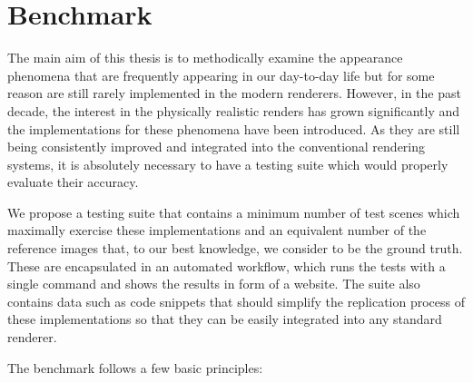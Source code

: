 \chapter{Benchmark}
\label{chap:benchmark}

The main aim of this thesis is to methodically examine the appearance phenomena that are frequently appearing in our day-to-day life but for some reason are still rarely implemented in the modern renderers. However, in the past decade, the interest in the physically realistic renders has grown significantly and the implementations for these phenomena have been introduced. As they are still being consistently improved and integrated into the conventional rendering systems, it is absolutely necessary to have a testing suite which would properly evaluate their accuracy.

We propose a testing suite that contains a minimum number of test scenes which maximally exercise these implementations and an equivalent number of the reference images that, to our best knowledge, we consider to be the ground truth. These are encapsulated in an automated workflow, which runs the tests with a single command and shows the results in form of a website. The suite also contains data such as code snippets that should simplify the replication process of these implementations so that they can be easily integrated into any standard renderer.

The benchmark follows a few basic principles:

